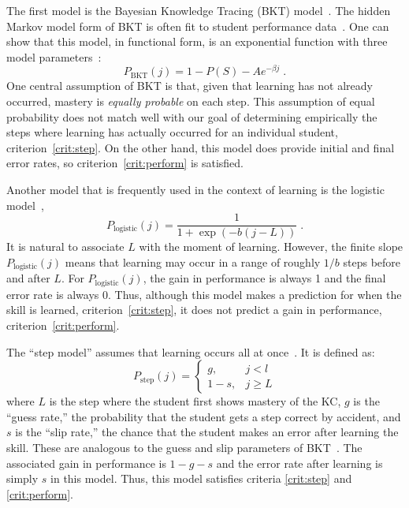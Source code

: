 \documentclass{acmlarge-edm}
\begin{document}
The first model is the Bayesian Knowledge Tracing (BKT) 
model~\cite{corbett_knowledge_1994}.  The hidden Markov model
form of BKT is often fit to student performance 
data~\cite{beck_identifiability:_2007}.  One can show that
this model, in functional form, is an exponential function
with three model parameters~\cite{van_de_sande_bayesian_2012}:
%
\begin{equation}
         P_\mathrm{BKT}(j) = 1-P(S) -A e^{-\beta j} \; .
\end{equation}
%
One central assumption of BKT is that, given that learning
has not already occurred, mastery is {\em equally probable} on each step.
This assumption of equal probability does not match well with 
our goal of determining empirically the steps where learning has 
actually occurred for an individual student, criterion~\ref{crit:step}.
On the other hand, this model does provide initial and final
error rates, so criterion~\ref{crit:perform} is satisfied. 

Another model that is frequently used in the context of 
learning is the logistic model~\cite{cen_learning_2006,min_chi_instructional_2011},
%
\begin{equation}
    P_\mathrm{logistic}(j)= \frac{1}{1+\exp\left(-b (j-L)\right)} \; .
\end{equation}
%
It is natural to associate $L$ with the moment of learning.  However,
the finite slope $P_\mathrm{logistic}(j)$ means that learning may occur
in a range of roughly $1/b$ steps before and after $L$.    For  
$P_\mathrm{logistic}(j)$, the gain in performance is always 1 and the final error
rate is always 0.  Thus, although this model makes a prediction for
when the skill is learned, criterion~\ref{crit:step}, it does
not predict a gain in performance, criterion~\ref{crit:perform}.

The ``step model'' assumes that learning occurs all at 
once~\cite{baker_detecting_2011}.  It is defined as:
%
\begin{equation}
    P_\mathrm{step}(j)= \left\{\begin{array}{cc}
                 g, & j<l \\
                 1-s, & j\ge L 
                 \end{array} \right. 
\end{equation}
%
where $L$ is the step where the student first shows mastery of the
KC, $g$ is the ``guess rate,'' the probability that the student
gets a step correct by accident, and $s$ is the ``slip rate,''
the chance that the student makes an error after learning
the skill.  These are analogous to the guess and slip parameters 
of BKT~\cite{corbett_knowledge_1994}.  
The associated gain in performance
is $1-g-s$ and the error rate after learning is simply $s$ in this
model.  Thus, this model satisfies criteria \ref{crit:step} and
\ref{crit:perform}.
\end{document}
